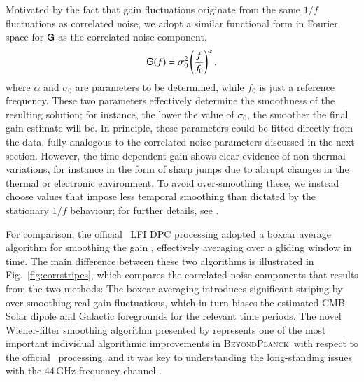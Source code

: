 \documentclass[twocolumn]{aa}
\newcommand{\BP}{\textsc{BeyondPlanck}}
\begin{document}
Motivated by the fact that gain fluctuations originate from the same
$1/f$ fluctuations as correlated noise, we adopt a similar functional
form in Fourier space for $\mathsf{G}$ as the correlated noise component,
\begin{equation}
    \mathsf{G}(f) = \sigma_0^2\left(\frac{f}{f_0}\right)^\alpha,
\end{equation}
where $\alpha$ and $\sigma_0$ are parameters to be determined, while
$f_0$ is just a reference frequency. These two parameters effectively
determine the smoothness of the resulting solution; for instance, the
lower the value of $\sigma_0$, the smoother the final gain estimate
will be. In principle, these parameters could be fitted directly from
the data, fully analogous to the correlated noise parameters discussed
in the next section. However, the time-dependent gain shows clear
evidence of non-thermal variations, for instance in the form of
sharp jumps due to abrupt changes in the thermal or electronic
environment. To avoid over-smoothing these, we instead choose values
that impose less temporal smoothing than dictated by the stationary
$1/f$ behaviour; for further details, see \citet{bp07}.

For comparison, the official \Planck\ LFI DPC processing adopted a
boxcar average algorithm for smoothing the gain
\citep{planck2014-a03}, effectively averaging over a gliding window in
time. The main difference between these two algorithms is illustrated
in Fig.~\ref{fig:corrstripes}, which compares the correlated noise
components that results from the two methods: The boxcar averaging
introduces significant striping by over-smoothing real gain
fluctuations, which in turn biases the estimated CMB Solar dipole and
Galactic foregrounds for the relevant time periods. The novel
Wiener-filter smoothing algorithm presented by \citet{bp07} represents
one of the most important individual algorithmic improvements in
\BP\ with respect to the official \Planck\ processing, and it was key
to understanding the long-standing issues with the 44\,GHz frequency
channel \citep{planck2016-l02}. 
\end{document}
